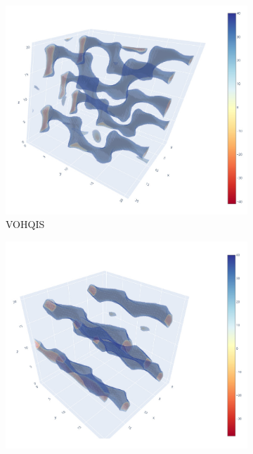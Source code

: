 \documentclass[main]{subfiles}
\begin{document}
\begin{figure}[ht]
  \centering
  \begin{subfigure}[b]{0.3\textwidth}
      \centering
      \includegraphics[width=\textwidth]{figures/5-diffusion/viz/VOHQIS.jpg}
      \caption{VOHQIS~\cite{Wragg_2001}}\label{fgr:zigzag_a}
  \end{subfigure}
  \hfill
  \begin{subfigure}[b]{0.3\textwidth}
      \centering
      \includegraphics[width=\textwidth]{figures/5-diffusion/viz/GUMDEZ.jpg}

\end{subfigure}
\end{figure}
\end{document}
